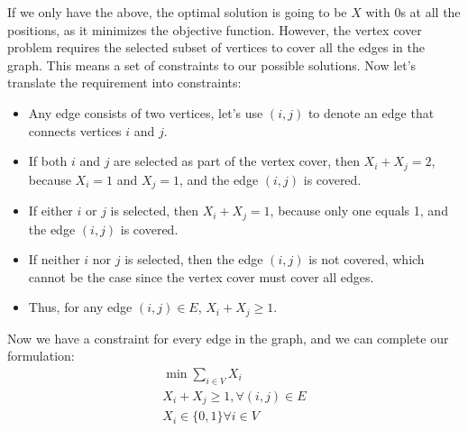\documentclass{article}
\begin{document}
If we only have the above, the optimal solution is going to be $X$ with 0s at
all the positions, as it minimizes the objective function.
However, the vertex cover problem requires the selected subset of vertices to
cover all the edges in the graph. This means a set of constraints to our
possible solutions. Now let's translate the requirement into constraints:
\begin{itemize}
\item Any edge consists of two vertices, let's use $(i,j)$
	to denote an edge that connects vertices $i$ and $j$.
\item If both $i$ and $j$ are selected as part of the vertex cover,
	then $X_i + X_j = 2$, because $X_i = 1$ and $X_j = 1$, and the edge
	$(i,j)$ is covered.
\item If either $i$ or $j$ is selected, then $X_i + X_j = 1$, because only one 
	equals 1, and the edge $(i,j)$ is covered.
\item If neither $i$ nor $j$ is selected, then the edge $(i,j)$ is not covered,
	which cannot be the case since the vertex cover must cover all edges.
\item Thus, for any edge $(i, j) \in E$, $X_i + X_j \ge 1$.
\end{itemize}

Now we have a constraint for every edge in the graph, and we can complete our
formulation:
\begin{equation}
\label{eq:vc_ilp}
\begin{split}
	\min \sum_{i \in V} X_i\\
	X_i + X_j \ge 1, \forall (i, j) \in E\\
	X_i \in \{0, 1\} \forall i \in V
\end{split}
\end{equation}
\end{document}
